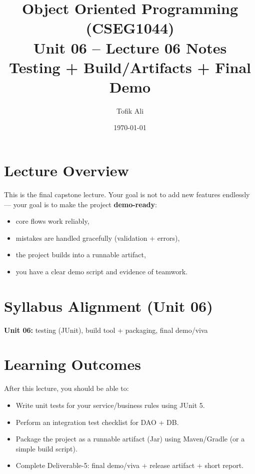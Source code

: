 \documentclass[11pt]{article}
\title{Object Oriented Programming (CSEG1044)\\Unit 06 -- Lecture 06 Notes\\Testing + Build/Artifacts + Final Demo}
\author{Tofik Ali}
\date{\today}
\begin{document}
\maketitle
\tableofcontents

\section{Lecture Overview}
This is the final capstone lecture.
Your goal is not to add new features endlessly --- your goal is to make the project \textbf{demo-ready}:
\begin{itemize}
  \item core flows work reliably,
  \item mistakes are handled gracefully (validation + errors),
  \item the project builds into a runnable artifact,
  \item you have a clear demo script and evidence of teamwork.
\end{itemize}
\notesources{\OOPSUnitVISources}

\section{Syllabus Alignment (Unit 06)}
\textbf{Unit 06:} testing (JUnit), build tool + packaging, final demo/viva

\section{Learning Outcomes}
After this lecture, you should be able to:
\begin{itemize}
  \item Write unit tests for your service/business rules using JUnit 5.
  \item Perform an integration test checklist for DAO + DB.
  \item Package the project as a runnable artifact (Jar) using Maven/Gradle (or a simple build script).
  \item Complete Deliverable-5: final demo/viva + release artifact + short report.
\end{itemize}
\end{document}
